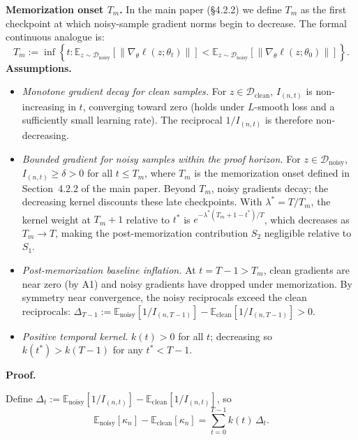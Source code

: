 \textbf{Memorization onset $T_m$.}
In the main paper (\S4.2.2) we define $T_m$ as the first checkpoint at which noisy-sample gradient norms begin to decrease.
The formal continuous analogue is:
\begin{equation}
    T_m := \inf\!\left\{t : \mathbb{E}_{z \sim \mathcal{D}_\text{noisy}}\!\left[\|\nabla_\theta \ell(z;\theta_t)\|\right] < \mathbb{E}_{z \sim \mathcal{D}_\text{noisy}}\!\left[\|\nabla_\theta \ell(z;\theta_0)\|\right]\right\}.
    \label{eq:Tm}
\end{equation}
\textbf{Assumptions.}
\begin{itemize}
    \item[\textbf{(A1)}] \textit{Monotone gradient decay for clean samples.}
        For $z \in \mathcal{D}_\text{clean}$, $I_{(n,t)}$ is non-increasing in $t$, converging toward zero (holds under $L$-smooth loss and a sufficiently small learning rate). The reciprocal $1/I_{(n,t)}$ is therefore non-decreasing.
    \item[\textbf{(A2)}] \textit{Bounded gradient for noisy samples within the proof horizon.}
        For $z \in \mathcal{D}_\text{noisy}$, $I_{(n,t)} \geq \delta > 0$ for all $t \leq T_m$, where $T_m$ is the memorization onset defined in Section~4.2.2 of the main paper.
        Beyond $T_m$, noisy gradients decay; the decreasing kernel discounts these late checkpoints.
        With $\lambda^* = T/T_m$, the kernel weight at $T_m+1$ relative to $t^*$ is $e^{-\lambda^*(T_m+1-t^*)/T}$, which decreases as $T_m \to T$, making the post-memorization contribution $S_2$ negligible relative to $S_1$.
    \item[\textbf{(A3)}] \textit{Post-memorization baseline inflation.}
        At $t = T-1 > T_m$, clean gradients are near zero (by A1) and noisy gradients have dropped under memorization.
        By symmetry near convergence, the noisy reciprocals exceed the clean reciprocals:
        $\Delta_{T-1} := \mathbb{E}_\text{noisy}[1/I_{(n,T-1)}] - \mathbb{E}_\text{clean}[1/I_{(n,T-1)}] > 0$.
    \item[\textbf{(A4)}] \textit{Positive temporal kernel.}
        $k(t) > 0$ for all $t$; decreasing so $k(t^*) > k(T-1)$ for any $t^* < T-1$.
\end{itemize}

\textbf{Proof.}

Define $\Delta_t := \mathbb{E}_\text{noisy}[1/I_{(n,t)}] - \mathbb{E}_\text{clean}[1/I_{(n,t)}]$, so
\begin{equation}
    \mathbb{E}_\text{noisy}[\kappa_n] - \mathbb{E}_\text{clean}[\kappa_n]
    = \sum_{t=0}^{T-1} k(t)\,\Delta_t.
\end{equation}


